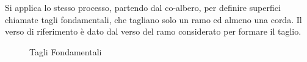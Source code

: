\documentclass{article}
\numberwithin{equation}{subsection}
\begin{document}
Si applica lo stesso processo, partendo dal co-albero, per definire superfici chiamate tagli fondamentali, che tagliano solo un ramo ed almeno una corda. Il verso di 
riferimento è dato dal verso del ramo considerato per formare il taglio. 
\begin{figure}[H]%
    \centering
    \qquad
    \label{fig:tagli-fondamentali-1-2}
\end{figure}
\begin{figure}[H]%
    \centering
    \qquad
    \caption{Tagli Fondamentali}%
    \label{fig:tagli-fondamentali-3-4}
\end{figure}
\end{document}
